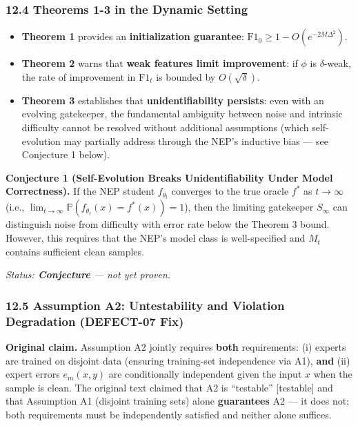 \documentclass[
  12pt,
]{article}
\providecommand{\tightlist}{%
  \setlength{\itemsep}{0pt}\setlength{\parskip}{0pt}}
\begin{document}
\subsubsection{12.4 Theorems 1-3 in the Dynamic
Setting}\label{theorems-1-3-in-the-dynamic-setting}

\begin{itemize}
\tightlist
\item
  \textbf{Theorem 1} provides an \textbf{initialization guarantee}:
  \(\text{F1}_0 \geq 1 - O(e^{-2M\Delta^2})\).
\item
  \textbf{Theorem 2} warns that \textbf{weak features limit
  improvement}: if \(\phi\) is \(\delta\)-weak, the rate of improvement
  in \(\text{F1}_t\) is bounded by \(O(\sqrt{\delta})\).
\item
  \textbf{Theorem 3} establishes that \textbf{unidentifiability
  persists}: even with an evolving gatekeeper, the fundamental ambiguity
  between noise and intrinsic difficulty cannot be resolved without
  additional assumptions (which self-evolution may partially address
  through the NEP's inductive bias --- see Conjecture 1 below).
\end{itemize}

\textbf{Conjecture 1 (Self-Evolution Breaks Unidentifiability Under
Model Correctness).} If the NEP student \(f_{\theta_t}\) converges to
the true oracle \(f^*\) as \(t \to \infty\) (i.e.,
\(\lim_{t\to\infty} \mathbb{P}(f_{\theta_t}(x) = f^*(x)) = 1\)), then
the limiting gatekeeper \(S_\infty\) can distinguish noise from
difficulty with error rate below the Theorem 3 bound. However, this
requires that the NEP's model class is well-specified and \(M_t\)
contains sufficient clean samples.

\emph{Status: \textbf{Conjecture} --- not yet proven.}

\subsubsection{12.5 Assumption A2: Untestability and Violation
Degradation (DEFECT-07
Fix)}\label{assumption-a2-untestability-and-violation-degradation-defect-07-fix}

\textbf{Original claim.} Assumption A2 jointly requires \textbf{both}
requirements: (i) experts are trained on disjoint data (ensuring
training-set independence via A1), \textbf{and} (ii) expert errors
\(e_m(x, y)\) are conditionally independent given the input \(x\) when
the sample is clean. The original text claimed that A2 is ``testable''
{[}testable{]} and that Assumption A1 (disjoint training sets) alone
\textbf{guarantees} A2 --- it does not; both requirements must be
independently satisfied and neither alone suffices.
\end{document}
